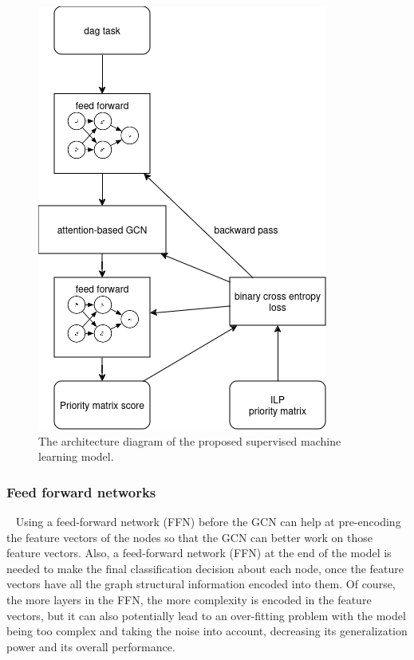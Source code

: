 \begin{figure}
    \centering
    \includegraphics[width=\linewidth]{images/designed_model.png}
    \caption{The architecture diagram of the proposed supervised machine learning model.}
    \label{fig:model_diagram}
\end{figure}

\subsubsection{Feed forward networks}
~
Using a feed-forward network (FFN) before the GCN can help at pre-encoding the feature vectors of the nodes
so that the GCN can better work on those feature vectors.
Also, a feed-forward network (FFN) at the end of the model is needed to make 
the final classification decision about each node, once the feature vectors have
all the graph structural information encoded into them.
Of course, the more layers in the FFN, the more complexity
is encoded in the feature vectors, but it can also potentially lead to an over-fitting
problem with the model being too complex and taking the noise into account,
decreasing its generalization power and its overall performance.

